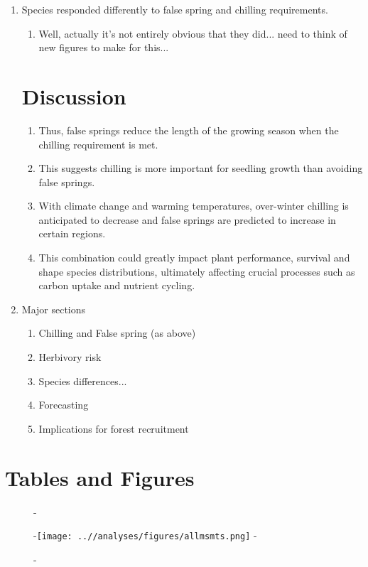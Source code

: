 \documentclass{article}\usepackage[]{graphicx}\usepackage[]{color}
\begin{document}
\begin{enumerate}
\item Species responded differently to false spring and chilling requirements.
  \begin{enumerate}
  \item Well, actually it's not entirely obvious that they did... need to think of new figures to make for this...
\end{enumerate}

\section*{Discussion}
\begin{enumerate}
  \item Thus, false springs reduce the length of the growing season when the chilling requirement is met.
  \item This suggests chilling is more important for seedling growth than avoiding false springs. 
  \item With climate change and warming temperatures, over-winter chilling is anticipated to decrease and false springs are predicted to increase in certain regions. 
  \item This combination could greatly impact plant performance, survival and shape species distributions, ultimately affecting crucial processes such as carbon uptake and nutrient cycling.
  \end{enumerate}
  
\item Major sections
  \begin{enumerate}
  \item Chilling and False spring (as above)
  \item Herbivory risk
  \item Species differences...
  \item Forecasting
  \item Implications for forest recruitment
  \end{enumerate}
\end{enumerate}






\section*{Tables and Figures}
  {\begin{figure} [H]
  -\begin{center}
  -\texttt{[image: ..//analyses/figures/allmsmts.png]} %
  -\end{center}
  -\end{figure}}
  
\end{document}
